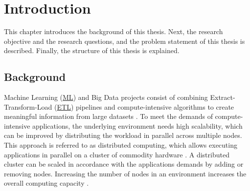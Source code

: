 \chapter{Introduction}
\label{chap:01_introduction}

This chapter introduces the background of this thesis.
Next, the research objective and the research questions, and the problem statement of this thesis is described.
Finally, the structure of this thesis is explained.


\section{Background}
Machine Learning (\hyperlink{abbr:ml}{ML}) and Big Data projects consist of combining Extract-Transform-Load (\hyperlink{abbr:etl}{ETL}) pipelines and compute-intensive algorithms to create meaningful information from large datasets \cite{Vadapalli2018DevOps}.
To meet the demands of compute-intensive applications, the underlying environment needs high scalability, which can be improved by distributing the workload in parallel across multiple nodes.
This approach is referred to as distributed computing, which allows executing applications in parallel on a cluster of commodity hardware \cite{Ganelin2016Spark}. A distributed cluster can be scaled in accordance with the applications demands by adding or removing nodes. Increasing the number of nodes in an environment increases the overall computing capacity \cite{Wilder2012CloudPatterns, Abbott2015ScalabilityArt}.


